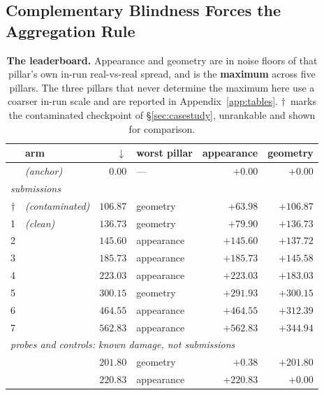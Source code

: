 \subsection{Complementary Blindness Forces the Aggregation Rule}
\label{sec:complementary}

\begin{table}[t]
\centering
\small
\setlength{\tabcolsep}{3pt}
\caption{\textbf{The leaderboard.} Appearance and geometry are in noise floors of that pillar's own in-run real-vs-real spread, and
\blockscore{} is the \textbf{maximum} across five pillars. The three pillars that never
determine the maximum here use a coarser in-run scale and are reported in
Appendix~\ref{app:tables}. $\dagger$~marks the contaminated checkpoint of \S\ref{sec:casestudy}, unrankable and shown for comparison.}
\label{tab:leaderboard}
\begin{tabular}{rlrlrr}
\toprule
& arm & \blockscore{}~$\downarrow$ & worst pillar & appearance & geometry \\
\midrule
  & \realheld{} \emph{(anchor)}      & $0.00$   & ---        & $+0.00$   & $+0.00$ \\
\midrule
\multicolumn{6}{l}{\emph{submissions}} \\
$\dagger$ & \voxar{} \emph{(contaminated)} & $106.87$ & geometry & $+63.98$ & $+106.87$ \\
1 & \voxar{} \emph{(clean)}          & $\mathbf{136.73}$ & geometry   & $+79.90$  & $+136.73$ \\
2 & \llmft{}                         & $145.60$ & appearance & $+145.60$ & $+137.72$ \\
3 & \llmgeo{}                        & $185.73$ & appearance & $+185.73$ & $+145.58$ \\
4 & \patchstitch{}                   & $223.03$ & appearance & $+223.03$ & $+183.03$ \\
5 & \gabled{}                        & $300.15$ & geometry   & $+291.93$ & $+300.15$ \\
6 & \hollowbox{}                     & $464.55$ & appearance & $+464.55$ & $+312.39$ \\
7 & \randomvox{}                     & $562.83$ & appearance & $+562.83$ & $+344.94$ \\
\midrule
\multicolumn{6}{l}{\emph{probes and controls: known damage, not submissions}} \\
  & \textbf{\solidify{}}             & $201.80$ & geometry   & $\mathbf{+0.38}$ & $\mathbf{+201.80}$ \\
  & \matshuffle{}                    & $220.83$ & appearance & $+220.83$ & $\mathbf{+0.00}$ \\

\end{tabular}
\end{table}
